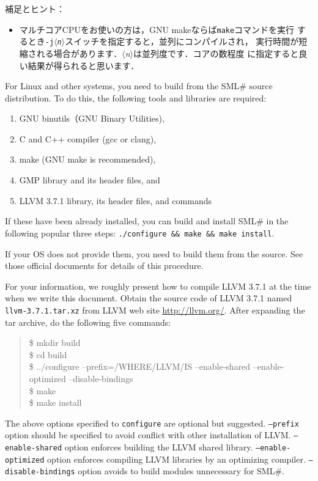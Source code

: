 \documentclass{jbook}
\newcommand{\smlsharp}{SML\#}
\newcommand{\nonterm}[1]{\mbox{$\langle$}{\it #1}\mbox{$\rangle$}}
\newenvironment{program}{\begin{quote}\begin{tt}}%
                        {\end{tt}\end{quote}}
\begin{document}
補足とヒント：
\begin{itemize}
\item マルチコアCPUをお使いの方は，GNU makeならば{\tt make}コマンドを実行
するとき{\tt -j\nonterm{n}}スイッチを指定すると，並列にコンパイルされ，
実行時間が短縮される場合があります．\nonterm{n}は並列度です．コアの数程度
に指定すると良い結果が得られると思います．
\end{itemize}

\else%
	For Linux and other systems, you need to build from the
\smlsharp{} source distribution.
	To do this, the following tools and libraries are required:
\begin{enumerate}
\item GNU binutils（GNU Binary Utilities),
\item C and C++ compiler (gcc or clang),
\item make (GNU make is recommended),
\item GMP library and its header files, and
\item LLVM 3.7.1 library, its header files, and commands
\end{enumerate}
	If these have been already installed, you can build and install
\smlsharp{} in the following popular three steps:
{\tt ./configure \&\& make \&\& make install}.

	If your OS does not provide them, you need to build them from the
source.
	See those official documents for details of this procedure.

	For your information, we roughly present how to compile LLVM 3.7.1
at the time when we write this document.
	Obtain the source code of LLVM 3.7.1 named
{\tt llvm-3.7.1.tar.xz}
from LLVM web site \url{http://llvm.org/}.
	After expanding the tar archive,
do the following five commands:
\begin{program}
\$ mkdir build\\
\$ cd build\\
\$ ../configure --prefix=/WHERE/LLVM/IS --enable-shared --enable-optimized --disable-bindings\\
\$ make\\
\$ make install
\end{program}
	The above options specified to {\tt configure} are optional but suggested.
	{\tt --prefix} option should be specified to avoid conflict with
other installation of LLVM.
	{\tt --enable-shared} option enforces building the LLVM shared library.
	{\tt --enable-optimized} option enforces compiling LLVM libraries by
an optimizing compiler.
	{\tt --disable-bindings} option avoids to build modules unnecessary
for \smlsharp{}.
\end{document}

